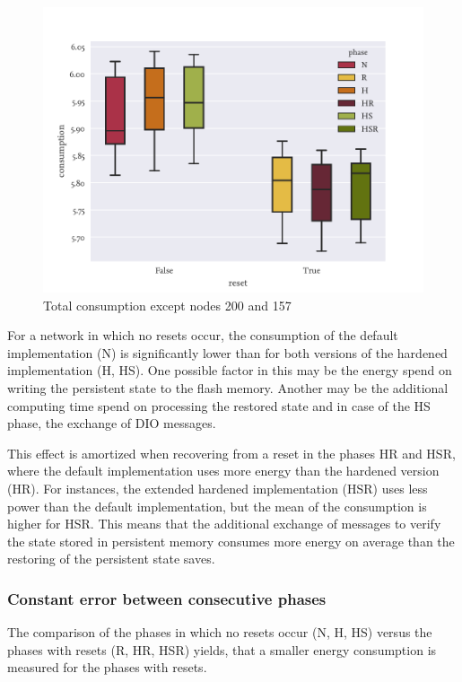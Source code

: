 \begin{figure}
  \centering
  \includegraphics[height=0.3\textheight]{../images/consumption-phases.pdf}
  \caption{Total consumption except nodes 200 and 157}
  \label{fig:consphases}
\end{figure}

For a network in which no resets occur, the consumption of the default
implementation (N) is significantly lower than for both versions of the hardened
implementation (H, HS). One possible factor in this may be the energy spend on writing
the persistent state to the flash memory. Another may be the additional
computing time spend on processing the restored state and in case of the HS
phase, the exchange of \ac{DIO} messages.

This effect is amortized when recovering from a reset in the phases HR and HSR,
where the default implementation uses more energy than the hardened version (HR).
For instances, the extended hardened implementation (HSR) uses less power than
the default implementation, but the mean of the consumption is higher for HSR.
This means that the additional exchange of messages to verify the state stored
in persistent memory consumes more energy on average than the restoring of the
persistent state saves.

\subsubsection{Constant error between consecutive phases}

The comparison of the phases in which no resets occur (N, H, HS) versus the
phases with resets (R, HR, HSR) yields, that a smaller energy consumption is
measured for the phases with resets. 

